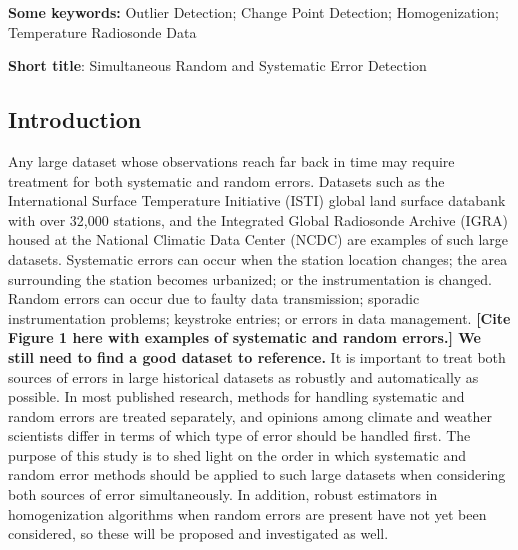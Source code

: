 \documentclass[12pt]{article}
\begin{document}

\begin{singlespacing}
\par\vfill\noindent
{\bf Some keywords:} Outlier Detection; Change Point Detection; Homogenization; Temperature Radiosonde Data

\par\medskip\noindent
{\bf Short title}:  Simultaneous Random and Systematic Error Detection

\end{singlespacing}
\clearpage\pagebreak\newpage {}
\begin{doublespacing}


\section{Introduction}

Any large dataset whose observations reach far back in time may require treatment for both systematic and random errors. Datasets such as the International Surface Temperature Initiative (ISTI) global land surface databank \cite{rennie14} with over 32,000 stations, and the Integrated Global Radiosonde Archive (IGRA) housed at the National Climatic Data Center (NCDC) \cite{durre06} are examples of such large datasets. Systematic errors can occur when the station location changes; the area surrounding the station becomes urbanized; or the instrumentation is changed. Random errors can occur due to faulty data transmission; sporadic instrumentation problems; keystroke entries; or errors in data management. \textbf{[Cite Figure 1 here with examples of systematic and random errors.]  We still need to find a good dataset to reference.} It is important to treat both sources of errors in  large historical datasets as robustly and automatically as possible. In most published research, methods for handling systematic and random errors are treated separately, and opinions among climate and weather scientists differ in terms of which type of error should be handled first. The purpose of this study is to shed light on the order in which systematic and random error methods should be applied to such large datasets when considering both sources of error simultaneously. In addition, robust estimators in homogenization algorithms when random errors are present have not yet been considered, so these will be proposed and investigated as well.


\end{doublespacing}
\end{document}
